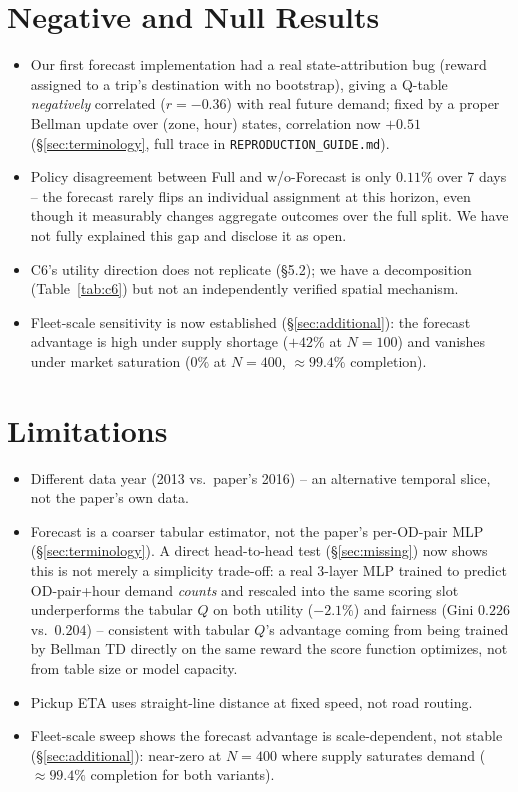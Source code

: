 \documentclass[10pt,twocolumn,a4paper]{article}
\begin{document}
\section{Negative and Null Results}
\label{sec:bug}
\begin{itemize}
\item Our first forecast implementation had a real state-attribution bug
(reward assigned to a trip's destination with no bootstrap), giving a Q-table
\emph{negatively} correlated ($r=-0.36$) with real future demand; fixed by a
proper Bellman update over (zone, hour) states, correlation now $+0.51$
(\S\ref{sec:terminology}, full trace in \texttt{REPRODUCTION\_GUIDE.md}).
\item Policy disagreement between Full and w/o-Forecast is only $0.11\%$
over 7 days -- the forecast rarely flips an individual assignment at this
horizon, even though it measurably changes aggregate outcomes over the full
split. We have not fully explained this gap and disclose it as open.
\item C6's utility direction does not replicate (\S5.2); we have a
decomposition (Table~\ref{tab:c6}) but not an independently verified
spatial mechanism.
\item Fleet-scale sensitivity is now established (\S\ref{sec:additional}): the forecast advantage is high under supply shortage ($+42\%$ at $N=100$) and vanishes under market saturation ($0\%$ at $N=400$, $\approx99.4\%$ completion).
\end{itemize}

\section{Limitations}
\begin{itemize}
\item Different data year (2013 vs.\ paper's 2016) -- an alternative
temporal slice, not the paper's own data.
\item Forecast is a coarser tabular estimator, not the paper's per-OD-pair
MLP (\S\ref{sec:terminology}). A direct head-to-head test
(\S\ref{sec:missing}) now shows this is not merely a simplicity trade-off:
a real 3-layer MLP trained to predict OD-pair+hour demand \emph{counts} and
rescaled into the same scoring slot underperforms the tabular $Q$ on both
utility ($-2.1\%$) and fairness (Gini $0.226$ vs.\ $0.204$) -- consistent
with tabular $Q$'s advantage coming from being trained by Bellman TD
directly on the same reward the score function optimizes, not from table
size or model capacity.
\item Pickup ETA uses straight-line distance at fixed speed, not road
routing.
\item Fleet-scale sweep shows the forecast advantage is scale-dependent,
not stable (\S\ref{sec:additional}): near-zero at $N=400$ where supply
saturates demand ($\approx99.4\%$ completion for both variants).
\end{itemize}
\end{document}
